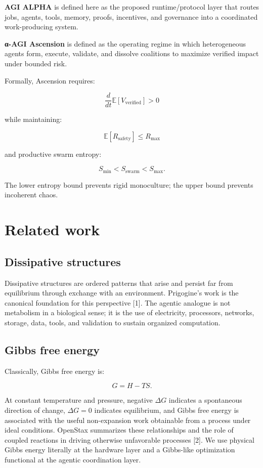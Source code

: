 \documentclass[11pt]{article}
\begin{document}
\textbf{AGI ALPHA} is defined here as the proposed runtime/protocol layer that routes jobs, agents, tools, memory, proofs, incentives, and governance into a coordinated work-producing system.

\textbf{α-AGI Ascension} is defined as the operating regime in which heterogeneous agents form, execute, validate, and dissolve coalitions to maximize verified impact under bounded risk.

Formally, Ascension requires:

\[
\frac{d}{dt}\mathbb{E}[V_{\text{verified}}] > 0
\]

while maintaining:

\[
\mathbb{E}[R_{\text{safety}}] \leq R_{\max}
\]

and productive swarm entropy:

\[
S_{\min}<S_{\text{swarm}}<S_{\max}.
\]

The lower entropy bound prevents rigid monoculture; the upper bound prevents incoherent chaos.

\section{Related work}\label{related-work}

\subsection{Dissipative structures}\label{dissipative-structures}

Dissipative structures are ordered patterns that arise and persist far from equilibrium through exchange with an environment. Prigogine's work is the canonical foundation for this perspective {[}1{]}. The agentic analogue is not metabolism in a biological sense; it is the use of electricity, processors, networks, storage, data, tools, and validation to sustain organized computation.

\subsection{Gibbs free energy}\label{gibbs-free-energy}

Classically, Gibbs free energy is:

\[
G=H-TS.
\]

At constant temperature and pressure, negative \(\Delta G\) indicates a spontaneous direction of change, \(\Delta G=0\) indicates equilibrium, and Gibbs free energy is associated with the useful non-expansion work obtainable from a process under ideal conditions. OpenStax summarizes these relationships and the role of coupled reactions in driving otherwise unfavorable processes {[}2{]}. We use physical Gibbs energy literally at the hardware layer and a Gibbs-like optimization functional at the agentic coordination layer.
\end{document}
